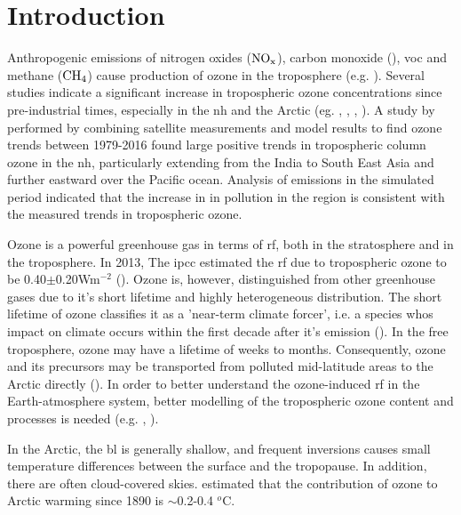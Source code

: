 \chapter{Introduction} \label{ch:introduction}
Anthropogenic emissions of nitrogen oxides ($\mathrm{NO_x}$), carbon monoxide (), \acrfull{voc} and methane ($\mathrm{CH_4}$) cause production of ozone in the troposphere (e.g. \cite{SeinfeldSpyros}). Several studies indicate a significant increase in tropospheric ozone concentrations since pre-industrial times, especially in the \acrfull{nh} and the Arctic (eg. \cite{WangJacob1998}, \cite{Shindell2007}, \cite{Parrish2014}, \cite{AMAP2015}). A study by \cite{ZIEMKE2019} performed by combining satellite measurements and model results to find ozone trends between 1979-2016 found large positive trends in tropospheric column ozone in the \acrshort{nh}, particularly extending from the India to South East Asia and further eastward over the Pacific ocean. Analysis of  emissions in the simulated period indicated that the increase in in pollution in the region is consistent with the measured trends in tropospheric ozone.  

\medskip

Ozone is a powerful greenhouse gas in terms of \acrfull{rf}, both in the stratosphere and in the troposphere. In 2013, The \acrfull{ipcc} estimated the \acrshort{rf} due to tropospheric ozone to be 0.40$\pm$0.20Wm$^{-2}$ (\cite{IPCCchapter8}). Ozone is, however, distinguished from other greenhouse gases due to it's short lifetime and highly heterogeneous distribution. The short lifetime of ozone classifies it as a 'near-term climate forcer', i.e. a species whos impact on climate occurs within the first decade after it's emission (\cite{IPCCchapter8}). In the free troposphere, ozone may have a lifetime of weeks to months. Consequently, ozone and its precursors may be transported from polluted mid-latitude areas to the Arctic directly (\cite{AMAP2015}). In order to better understand the ozone-induced \acrshort{rf} in the Earth-atmosphere system, better modelling of the tropospheric ozone content and processes is needed (e.g. \cite{Bowman2013}, \cite{Parella}). 

\medskip

In the Arctic, the \acrfull{bl} is generally shallow, and frequent inversions causes small temperature differences between the surface and the tropopause. In addition, there are often cloud-covered skies. \cite{Shindell2009} estimated that the contribution of ozone to Arctic warming since 1890 is $\sim$0.2-0.4 $^o$C. 

